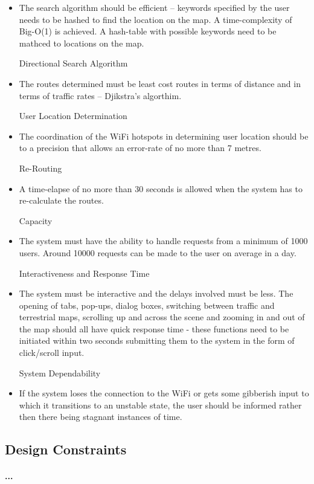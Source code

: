 \documentclass[runningheads,a4paper]{llncs}
\begin{document}
\begin {itemize}
Map Search Algorithm
\item The search algorithm should be efficient – keywords specified by the user needs to be hashed to find the location on the map. A time-complexity of Big-O(1) is achieved. A hash-table with possible keywords need to be mathced to locations on the map.

Directional Search Algorithm
\item The routes determined must be least cost routes in terms of distance and in terms of traffic rates – Djikstra’s algorthim.

User Location Determination
\item The coordination of the WiFi hotspots in determining user location should be to a precision that allows an error-rate of no more than 7 metres.

Re-Routing
\item A time-elapse of no more than 30 seconds is allowed when the system has to re-calculate the routes.

Capacity
\item The system must have the ability to handle requests from a minimum of 1000 users. Around 10000 requests can be made to the user on average in a day.

Interactiveness and Response Time
\item The system must be interactive and the delays involved must be less. The opening of tabs, pop-ups, dialog boxes, switching between traffic and terrestrial maps, scrolling up and across the scene and zooming in and out of the map should all have quick response time - these functions need to be initiated within two seconds submitting them to the system in the form of click/scroll input.

System Dependability
\item If the system loses the connection to the WiFi or gets some gibberish input to which it transitions to an unstable state, the user should be informed rather then there being stagnant instances of time.

\end{itemize}

\subsection{Design Constraints}
\paragraph{...}
\end{document}
